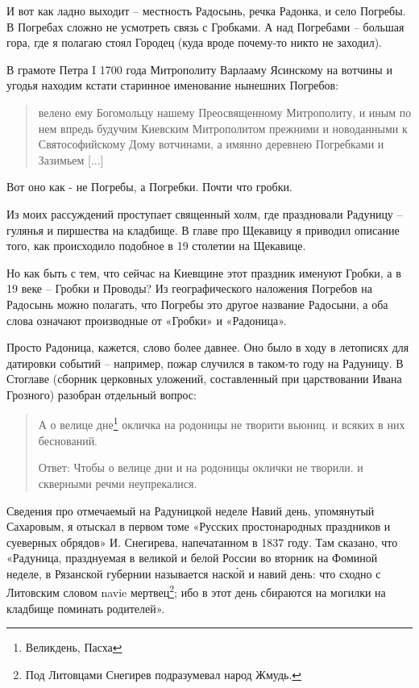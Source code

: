 И вот как ладно выходит – местность Радосынь, речка Радонка, и село Погребы. В Погребах сложно не усмотреть связь с Гробками. А над Погребами – большая гора, где я полагаю стоял Городец (куда вроде почему-то никто не заходил).

В грамоте Петра I 1700 года Митрополиту Варлааму Ясинскому на вотчины и угодья находим кстати старинное именование нынешних Погребов:

\begin{quotation}
велено ему Богомольцу нашему Преосвященному Митрополиту, и иным по нем впредь будучим Киевским Митрополитом прежними и новоданными к Святософийскому Дому вотчинами, а имянно деревнею Погребками и Зазимьем [...]\end{quotation}

Вот оно как - не Погребы, а Погребки. Почти что гробки.

Из моих рассуждений проступает священный холм, где праздновали Радуницу – гулянья и пиршества на кладбище. В главе про Щекавицу я приводил описание того, как происходило подобное в 19 столетии на Щекавице.

Но как быть с тем, что сейчас на Киевщине этот праздник именуют Гробки, а в 19 веке – Гробки и Проводы? Из географического наложения Погребов на Радосынь можно полагать, что Погребы это другое название Радосыни, а оба слова означают производные от «Гробки» и «Радоница».

Просто Радоница, кажется, слово более давнее. Оно было в ходу в летописях для датировки событий – например, пожар случился в таком-то году на Радуницу. В Стоглаве (сборник церковных уложений, составленный при царствовании Ивана Грозного) разобран отдельный вопрос:

\begin{quotation}
А о велице дне\footnote{Великдень, Пасха} окличка на родоницы не творити вьюниц. и всяких в них беснований.

Ответ: Чтобы о велице дни и на родоницы оклички не творили. и скверными речми неупрекалися.
\end{quotation}

Сведения про отмечаемый на Радуницкой неделе Навий день, упомянутый Сахаровым, я отыскал в первом томе «Русских простонародных праздников и суеверных обрядов» И. Снегирева, напечатанном в 1837 году. Там сказано, что «Радуница, празднуемая в великой и белой России во вторник на Фоминой неделе, в Рязанской губернии называется наск\'ой и навий день: что сходно с Литовским словом navie мертвец\footnote{Под Литовцами Снегирев подразумевал народ Жмудь.}; ибо в этот день сбираются на могилки на кладбище поминать родителей».

